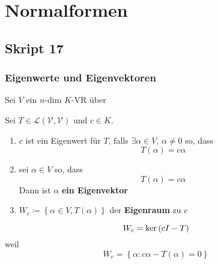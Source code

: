 \section{Normalformen}
\setcounter{subsection}{16}
\subsection{Skript 17}

\setcounter{subsubsection}{8}
\subsubsection{Eigenwerte und Eigenvektoren}
Sei $ V $ ein $ n $-dim $ K $-VR über

\begin{subdefinition}
	Sei $ T \in \mathcal{L(V, V)}  $ und $ c \in K $.
	\begin{enumerate}[label=(\alph*)]
		\item $ c $ ist ein Eigenwert für $ T $, falls $ \exists \alpha \in V $, $ \alpha \neq 0 $ so, dass
			\[
				T(\alpha) = c \alpha
			\]
		\item sei $ \alpha \in V $ so, dass
			\[
				T(\alpha) = c\alpha
			\]
			Dann ist $ \alpha $ \textbf{ein Eigenvektor}
		\item $ W_c \coloneqq \left\{ \alpha \in V, T(\alpha) \right\}  $ 
			der \textbf{Eigenraum} zu $ c $
	\end{enumerate}
\end{subdefinition}

\begin{subnote}
	\[
		W_c = \operatorname{ker} \left( cI - T \right) 
	\]
	weil
	\[
		W_c = \left\{ \alpha : c\alpha - T(\alpha) = 0 \right\} 
	\]
\end{subnote}

